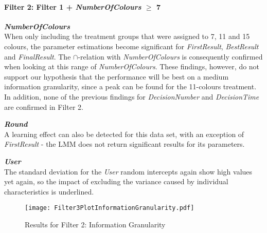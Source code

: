 \paragraph{Filter 2: Filter 1 + \textit{NumberOfColours} $\geq$ 7}
\textbf{\textit{NumberOfColours} }\\
When only including the treatment groups that were assigned to 7, 11 and 15 colours, the parameter estimations become significant for \textit{FirstResult}, \textit{BestResult} and \textit{FinalResult}. The \textbf{$\cap$}-relation with \textit{NumberOfColours} is consequently confirmed when looking at this range of \textit{NumberOfColours}. These findings, however, do not support our hypothesis that the performance will be best on a medium information granularity, since a peak can be found for the 11-colours treatment. In addition, none of the previous findings for \textit{DecisionNumber} and \textit{DecisionTime} are confirmed in Filter 2.

\textbf{\textit{Round} }\\
 A learning effect can also be detected for this data set, with an exception of \textit{FirstResult} - the \ac{LMM} does not return significant results for its parameters. 

\textbf{\textit{User} }\\
The standard deviation for the \textit{User} random intercepts again show high values yet again, so the impact of excluding the variance caused by individual characteristics is underlined.\\

\begin{figure}[H] %
\begin{center}
\texttt{[image: Filter3PlotInformationGranularity.pdf]}    
  \caption[Results for Filter 2: Information Granularity]{Results for Filter 2: Information Granularity\footnotemark}
    \label{fig:Results for Filter 3: Information Granularity} 
\end{center}
\end{figure}

